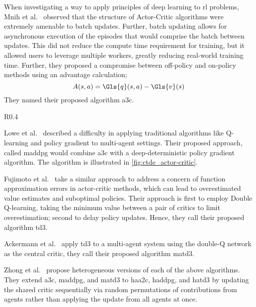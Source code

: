When investigating a way to apply principles of deep learning to \gls{rl}
problems, Mnih et al.~\cite{mnih2016} observed that the structure of
Actor-Critic algorithms were extremely amenable to batch updates.
Further, batch updating allows for asynchronous execution of 
the episodes that would comprise the batch between updates.
This did not reduce the compute time requirement for training, 
but it allowed users to leverage multiple workers, 
greatly reducing real-world training time.
Further, they proposed a compromise between off-policy and on-policy
methods using an advantage calculation;
\begin{equation}
    A(s,a) = \Gls{q}(s,a) - \Gls{v}(s)
\end{equation}
They named their proposed algorithm \gls{a3c}.

\begin{wrapfigure}[9]{R}{0.4\textwidth}
    \vspace*{-1em}
    \centering
    \resizebox{0.4\textwidth}{!}{%
       
    }
    \caption{Actor-Critic \gls{ctde}.}
    \label{fig:ctde_actor-critic}
\end{wrapfigure}

Lowe et al.~\cite{lowe2020} described a difficulty in applying traditional 
algorithms like Q-learning and policy gradient to multi-agent settings.
Their proposed approach, called \gls{maddpg} would combine \gls{a3c} 
with a deep-deterministic policy gradient algorithm.
The algorithm is illustrated in \cref{fig:ctde_actor-critic}.

Fujimoto et al.~\cite{fujimoto2018} take a similar approach to address 
a concern of function approximation errors in actor-critic methods, 
which can lead to overestimated value estimates and suboptimal policies.
Their approach is first to employ Double Q-learning, taking the 
minimum value between a pair of critics to limit overestimation;
second to delay policy updates. 
Hence, they call their proposed algorithm \gls*{td3}.

Ackermann et al.~\cite{ackermann2019} apply \gls{td3} to 
a multi-agent system using the double-Q network as the central
critic, they call their proposed algorithm \gls{matd3}.

Zhong et al.~\cite{zhong2024} propose heterogeneous versions of each
of the above algorithms.
They extend \gls{a3c}, \gls{maddpg}, and \gls{matd3}
to \gls{haa2c}, \gls{haddpg}, and \gls{hatd3}
by updating the shared critic 
sequentially via random permutations of contributions from agents
rather than applying the update from all agents at once.

